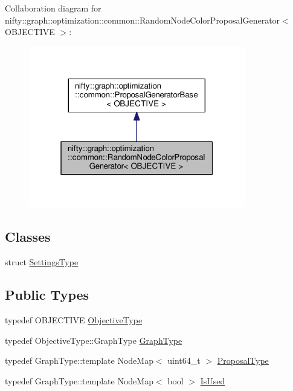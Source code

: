 Collaboration diagram for nifty\+:\+:graph\+:\+:optimization\+:\+:common\+:\+:Random\+Node\+Color\+Proposal\+Generator$<$ O\+B\+J\+E\+C\+T\+I\+V\+E $>$\+:\nopagebreak
\begin{figure}[H]
\begin{center}
\leavevmode
\includegraphics[width=268pt]{classnifty_1_1graph_1_1optimization_1_1common_1_1RandomNodeColorProposalGenerator__coll__graph}
\end{center}
\end{figure}
\subsection*{Classes}
\begin{DoxyCompactItemize}
\item 
struct \hyperlink{structnifty_1_1graph_1_1optimization_1_1common_1_1RandomNodeColorProposalGenerator_1_1SettingsType}{Settings\+Type}
\end{DoxyCompactItemize}
\subsection*{Public Types}
\begin{DoxyCompactItemize}
\item 
typedef O\+B\+J\+E\+C\+T\+I\+V\+E \hyperlink{classnifty_1_1graph_1_1optimization_1_1common_1_1RandomNodeColorProposalGenerator_a84ad8b16bdc71fdac75166ad9b37a747}{Objective\+Type}
\item 
typedef Objective\+Type\+::\+Graph\+Type \hyperlink{classnifty_1_1graph_1_1optimization_1_1common_1_1RandomNodeColorProposalGenerator_a3f0b05d046b0dd8aef5843fde5278feb}{Graph\+Type}
\item 
typedef Graph\+Type\+::template Node\+Map$<$ uint64\+\_\+t $>$ \hyperlink{classnifty_1_1graph_1_1optimization_1_1common_1_1RandomNodeColorProposalGenerator_a3ee44363c937082dc3f8bd269da30d14}{Proposal\+Type}
\item 
typedef Graph\+Type\+::template Node\+Map$<$ bool $>$ \hyperlink{classnifty_1_1graph_1_1optimization_1_1common_1_1RandomNodeColorProposalGenerator_a40c7d60c940dda11289016f362e4f6d9}{Is\+Used}
\end{DoxyCompactItemize}
